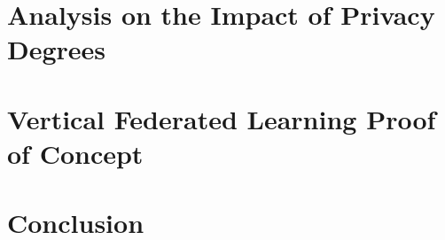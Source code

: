\documentclass[12pt,a4paper,oneside]{book}
\begin{document}
\chapter{Analysis on the Impact of Privacy Degrees}\label{chapter:analysis:privacy}


\chapter{Vertical Federated Learning Proof of Concept}\label{chapter:vertical}


\chapter{Conclusion}\label{chapter:conclusion}






\end{document}

